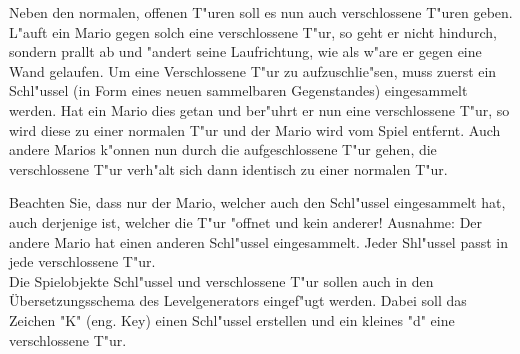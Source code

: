 Neben den normalen, offenen T"uren soll es nun auch verschlossene T"uren geben.
L"auft ein Mario gegen solch eine verschlossene T"ur, so geht er nicht hindurch, sondern prallt ab und "andert seine Laufrichtung, wie als w"are er gegen eine Wand gelaufen.
Um eine Verschlossene T"ur zu aufzuschlie"sen, muss zuerst ein Schl"ussel (in Form eines neuen sammelbaren Gegenstandes) eingesammelt werden. Hat ein Mario dies getan und ber"uhrt er nun eine verschlossene T"ur, so wird diese zu einer normalen T"ur und der Mario wird vom Spiel entfernt. 
Auch andere Marios k"onnen nun durch die aufgeschlossene T"ur gehen, die verschlossene T"ur verh"alt sich dann identisch zu einer normalen T"ur.

Beachten Sie, dass nur der Mario, welcher auch den Schl"ussel eingesammelt hat, auch derjenige ist, welcher die T"ur "offnet und kein anderer! 
Ausnahme: Der andere Mario hat einen anderen Schl"ussel eingesammelt. Jeder Shl"ussel passt in jede verschlossene T"ur.\\
Die Spielobjekte Schl"ussel und verschlossene T"ur sollen auch in den Übersetzungsschema des Levelgenerators eingef"ugt werden. Dabei soll das Zeichen "K" (eng. Key) einen Schl"ussel erstellen und ein kleines "d" \: eine verschlossene T"ur. 